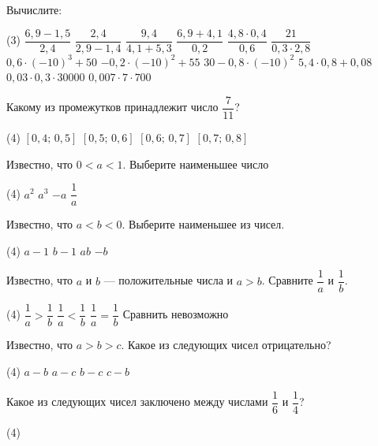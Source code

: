 \begin{class}[number=2]
	\begin{listofex}
		\item Вычислите:
		\begin{tasks}(3)
			\task \( \dfrac{6,9-1,5}{2,4} \)
			\task \( \dfrac{2,4}{2,9-1,4} \)
			\task \( \dfrac{9,4}{4,1+5,3} \)
			\task \( \dfrac{6,9+4,1}{0,2} \)
			\task \( \dfrac{4,8\cdot0,4}{0,6} \)
			\task \( \dfrac{21}{0,3\cdot2,8} \)
			\task \( 0,6\cdot(-10)^3+50 \)
			\task \( -0,2\cdot(-10)^2+55 \)
			\task \( 30-0,8\cdot(-10)^2 \)
			\task \( 5,4\cdot0,8+0,08 \)
			\task \( 0,03\cdot0,3\cdot30000 \)
			\task \( 0,007\cdot7\cdot700 \)
		\end{tasks}
		\item Какому из промежутков принадлежит число \( \dfrac{7}{11} \)?
		\begin{tasks}(4)
			\task \( [0,4; \, 0,5] \)
			\task \( [0,5; \, 0,6] \)
			\task \( [0,6; \, 0,7] \)
			\task \( [0,7; \, 0,8] \)
		\end{tasks}
		\item Известно, что \( 0<a<1 \). Выберите наименьшее число
		\begin{tasks}(4)
			\task \( a^2 \)
			\task \( a^3 \)
			\task \( -a \)
			\task \( \dfrac{1}{a} \)
		\end{tasks}
		\item Известно, что \( a<b<0 \). Выберите наименьшее из чисел.
		\begin{tasks}(4)
			\task \( a-1 \)
			\task \( b-1 \)
			\task \( ab \)
			\task \( -b \)
		\end{tasks}
		\item Известно, что \( a \) и \( b \) --- положительные числа и \( a>b \). Сравните \( \dfrac{1}{a} \) и \( \dfrac{1}{b} \).
		\begin{tasks}(4)
			\task \( \dfrac{1}{a}>\dfrac{1}{b} \)
			\task \( \dfrac{1}{a}<\dfrac{1}{b} \)
			\task \( \dfrac{1}{a}=\dfrac{1}{b} \)
			\task Сравнить невозможно
		\end{tasks}
		\item Известно, что \( a>b>c \). Какое из следующих чисел отрицательно?
		\begin{tasks}(4)
			\task \( a-b \)
			\task \( a-c \)
			\task \( b-c \)
			\task \( c-b \)
		\end{tasks}
		\item Какое из следующих чисел заключено между числами \( \dfrac{1}{6} \) и \( \dfrac{1}{4} \)?
		\begin{tasks}(4)

\end{tasks}
\end{listofex}
\end{class}

